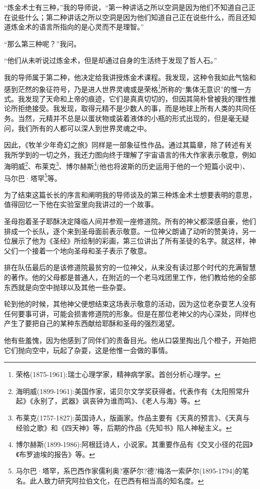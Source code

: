 \documentclass[twoside,openany]{book}
\begin{document}
“炼金术士有三种，”我的导师说，“第一种讲话之所以空洞是因为他们不知道自己正在说些什么；第二种讲话之所以空洞是因为他们知道自己正在说些什么，而且还知道炼金术的语言所指向的是心灵而不是理智。”

“那么第三种呢？”我问。

“他们从未听说过炼金术，但是却通过自身的生活终于发现了哲人石。”

我的导师属于第二种，他决定给我讲授炼金术课程。我发现，这种令我如此气恼和感到茫然的象征符号，乃是进人世界灵魂或是荣格\footnote{荣格(1875-1961):瑞士心理学家，精神病学家。首创分析心理学。}所称的“集体无意识”的惟一方式。我发现了天命和上帝的痕迹，它们是真真切切的，但因其简朴曾被我的理性推论所拒绝接受。我发现，取得元精不是少数人的事，而是地球上所有人类的共同任务。当然，元精并不总是以蛋状物或装着液体的小瓶的形式出现的，但是毫无疑问，我们所有的人都可以深人到世界灵魂之中。

因此，《牧羊少年奇幻之旅》同样是一部象征性作品。通过其篇章，除了转述有关我所学到的一切之外，我还力图向终于理解了宇宙语言的伟大作家表示敬意，例如海明威\footnote{海明威(1899-1961):美国作家，诺贝尔文学奖获得者。代表作有《太阳照常升起》《永别了，武器》讽丧钟为谁而鸣》、《老人与海》等。}、布莱克\footnote{布莱克(1757-1827):英国诗人，版画家。作品主要有《天真的预言》、《天真与经验之歌》和《四天神》等，后期的作品《先知书》陷人神秘主义。}、博尔赫斯\footnote{博尔赫斯(1899-1986):阿根廷诗人，小说家。其重要作品有《交叉小径的花园》《布罗迪埃的报告》等。}(他也将波斯的历史运用于他的一个短篇小说中)、马尔巴·塔罕\footnote{马尔巴·塔罕，系巴西作家儒利奥?塞萨尔?德?梅洛一索萨尔(1895-1794)的笔名。此人致力研究阿拉伯文化，在巴西有相当高的知名度。}等。

为了结束这篇长长的序言和阐明我的导师谈及的第三种炼金术士想要表明的意思，值得回忆一下他在实验室里向我讲过的一个故事。

圣母抱着圣子耶酥决定降临人间并参观一座修道院。所有的神父都深感自豪，他们排成一个长队，逐个来到圣母面前表示敬意。一位神父朗诵了动听的赞美诗，另一位展示了他为《圣经》所绘制的彩画，第三位讲出了所有圣徒的名字。就这样，神父们一个接着一个地向圣母和圣子表示了敬意。

排在队伍最后的是该修道院最贫穷的一位神父，从来没有读过那个时代的充满智慧的著作。他的父母都是普通人，在附近的一个老马戏团里工作，他们教给他的全部东西就是向空中抛球以及其他一些杂耍。

轮到他的时候，其他神父便想结束这场表示敬意的活动，因为这位老杂耍艺人没有任何要事可讲，可能会损害修道院的形象。但是在那位老神父的内心深处，同样也产生了要把自己的某种东西献给耶酥和圣母的强烈渴望。

他有些羞愧，因为他感到了同伴们的责备目光。他从口袋里掏出几个橙子，开始把它们抛向空中，玩起了杂耍，这是他惟一会做的事情。
\end{document}
